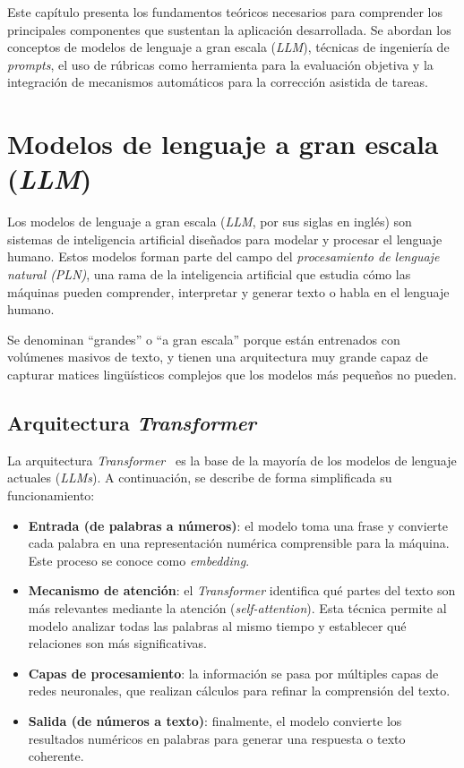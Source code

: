 
Este capítulo presenta los fundamentos teóricos necesarios para comprender los principales componentes que sustentan la aplicación desarrollada. Se abordan los conceptos de modelos de lenguaje a gran escala (\textit{LLM}), técnicas de ingeniería de \textit{prompts}, el uso de rúbricas como herramienta para la evaluación objetiva y la integración de mecanismos automáticos para la corrección asistida de tareas.

\section{Modelos de lenguaje a gran escala (\textit{LLM})}

Los modelos de lenguaje a gran escala (\textit{LLM}, por sus siglas en inglés) son sistemas de 
inteligencia artificial diseñados para modelar y procesar el lenguaje humano. 
Estos modelos forman parte del campo del \textit{procesamiento de lenguaje natural (PLN)}\cite{ibm:pln2024}, 
una rama de la inteligencia artificial que estudia cómo las máquinas pueden comprender, 
interpretar y generar texto o habla en el lenguaje humano.

Se denominan ``grandes'' o ``a gran escala'' porque están entrenados con volúmenes 
masivos de texto, y tienen una arquitectura muy grande capaz de capturar matices 
lingüísticos complejos que los modelos más pequeños no pueden\cite{wiki:llm}.

\subsection*{Arquitectura \textit{Transformer}}

La arquitectura \textit{Transformer}~\cite{datacamp:transformers2024} es la base de la mayoría de los modelos de lenguaje actuales (\textit{LLMs}). A continuación, se describe de forma simplificada su funcionamiento:

\begin{itemize}
    \item \textbf{Entrada (de palabras a números)}: el modelo toma una frase y convierte cada palabra en una representación numérica comprensible para la máquina. Este proceso se conoce como \textit{embedding}.
    
    \item \textbf{Mecanismo de atención}: el \textit{Transformer} identifica qué partes del texto son más relevantes mediante la atención (\textit{self-attention}). Esta técnica permite al modelo analizar todas las palabras al mismo tiempo y establecer qué relaciones son más significativas.
    
    \item \textbf{Capas de procesamiento}: la información se pasa por múltiples capas de redes neuronales, que realizan cálculos para refinar la comprensión del texto.
    
    \item \textbf{Salida (de números a texto)}: finalmente, el modelo convierte los resultados numéricos en palabras para generar una respuesta o texto coherente.
\end{itemize}


